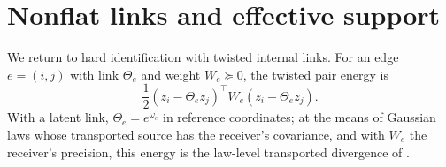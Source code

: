 \section{Nonflat links and effective support}
\label{sec:cg-effective-support}

We return to hard identification with twisted internal links. For an edge
\(e=(i,j)\) with link \(\Theta_e\) and weight \(W_e\succeq0\), the twisted pair
energy is
\begin{equation}
\frac12(z_i-\Theta_ez_j)^\top W_e(z_i-\Theta_ez_j).
\label{eq:cg-twisted-pair}
\end{equation}
With a latent link, \(\Theta_e=e^{\mathring\omega_e}\) in reference coordinates;
at the means of Gaussian laws whose transported source has the receiver's
covariance, and with \(W_e\) the receiver's precision, this energy is the
law-level transported divergence of .

